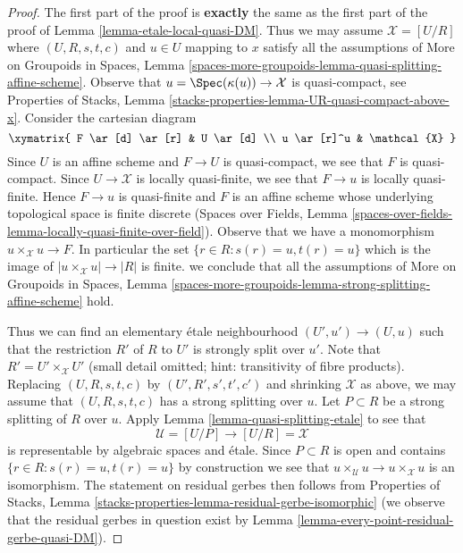 \begin{proof}
The first part of the proof is {\bf exactly} the same as the first part
of the proof of Lemma \ref{lemma-etale-local-quasi-DM}.
Thus we may assume $\mathcal{X} = [U/R]$ where $(U, R, s, t, c)$
and $u \in U$ mapping to $x$ satisfy all the assumptions of
More on Groupoids in Spaces, Lemma
\ref{spaces-more-groupoids-lemma-quasi-splitting-affine-scheme}.
Observe that $u = \Spec(\kappa(u)) \to \mathcal{X}$ is quasi-compact, see
Properties of Stacks, Lemma
\ref{stacks-properties-lemma-UR-quasi-compact-above-x}.
Consider the cartesian diagram
$$
\xymatrix{
F \ar[d] \ar[r] & U \ar[d] \\
u \ar[r]^u & \mathcal{X}
}
$$
Since $U$ is an affine scheme and $F \to U$ is quasi-compact,
we see that $F$ is quasi-compact. Since $U \to \mathcal{X}$
is locally quasi-finite, we see that $F \to u$ is
locally quasi-finite. Hence $F \to u$ is quasi-finite
and $F$ is an affine scheme whose underlying topological
space is finite discrete (Spaces over Fields, Lemma
\ref{spaces-over-fields-lemma-locally-quasi-finite-over-field}).
Observe that we have a monomorphism $u \times_\mathcal{X} u \to F$.
In particular the set $\{r \in R : s(r) = u, t(r) = u\}$
which is the image of $|u \times_\mathcal{X} u| \to |R|$
is finite. we conclude that all the assumptions of
More on Groupoids in Spaces, Lemma
\ref{spaces-more-groupoids-lemma-strong-splitting-affine-scheme}
hold.

\medskip\noindent
Thus we can find an elementary \'etale neighbourhood
$(U', u') \to (U, u)$ such that the restriction $R'$ of $R$ to $U'$
is strongly split over $u'$. Note that $R' = U' \times_\mathcal{X} U'$
(small detail omitted; hint: transitivity of fibre products).
Replacing $(U, R, s, t, c)$ by $(U', R', s', t', c')$ and shrinking
$\mathcal{X}$ as above, we may assume that $(U, R, s, t, c)$ has
a strong splitting over $u$. Let $P \subset R$ be a strong splitting
of $R$ over $u$. Apply Lemma \ref{lemma-quasi-splitting-etale} to see that
$$
\mathcal{U} = [U/P] \longrightarrow [U/R] = \mathcal{X}
$$
is representable by algebraic spaces and \'etale. Since $P \subset R$
is open and contains $\{r \in R : s(r) = u, t(r) = u\}$ by construction
we see that
$u \times_\mathcal{U} u \to u \times_\mathcal{X} u$ is an isomorphism.
The statement on residual gerbes then follows from
Properties of Stacks, Lemma
\ref{stacks-properties-lemma-residual-gerbe-isomorphic}
(we observe that the residual gerbes in question exist by
Lemma \ref{lemma-every-point-residual-gerbe-quasi-DM}).
\end{proof}







